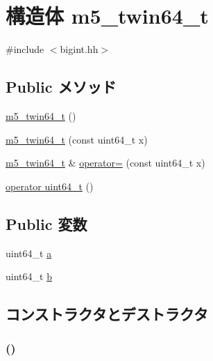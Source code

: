 \hypertarget{structm5__twin64__t}{
\section{構造体 m5\_\-twin64\_\-t}
\label{structm5__twin64__t}
}


{\ttfamily \#include $<$bigint.hh$>$}\subsection*{Public メソッド}
\begin{DoxyCompactItemize}
\item 
\hyperlink{structm5__twin64__t_ac21b787dbc31148269bd864ba4fc73b7}{m5\_\-twin64\_\-t} ()
\item 
\hyperlink{structm5__twin64__t_af388e832cd78c1de8d111b154b1614e1}{m5\_\-twin64\_\-t} (const uint64\_\-t x)
\item 
\hyperlink{structm5__twin64__t}{m5\_\-twin64\_\-t} \& \hyperlink{structm5__twin64__t_a9e502b0d4646a8e82491a77ae19698c8}{operator=} (const uint64\_\-t x)
\item 
\hyperlink{structm5__twin64__t_a1ba17e534ee6d9b9826f92bf6a5fce71}{operator uint64\_\-t} ()
\end{DoxyCompactItemize}
\subsection*{Public 変数}
\begin{DoxyCompactItemize}
\item 
uint64\_\-t \hyperlink{structm5__twin64__t_a943da41846f7804fa8edd8b012551545}{a}
\item 
uint64\_\-t \hyperlink{structm5__twin64__t_ad66453096871179e6c6effe0df4b483b}{b}
\end{DoxyCompactItemize}


\subsection{コンストラクタとデストラクタ}
\hypertarget{structm5__twin64__t_ac21b787dbc31148269bd864ba4fc73b7}{
\subsubsection[{m5\_\-twin64\_\-t}]{ ()}}
\label{structm5__twin64__t_ac21b787dbc31148269bd864ba4fc73b7}




